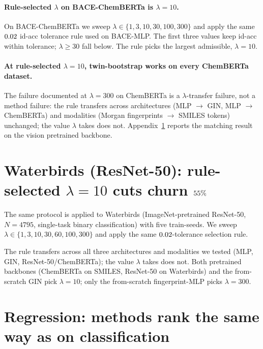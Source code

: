 \paragraph{\boldmath Rule-selected $\lambda$ on BACE-ChemBERTa is $\lambda{=}10$.}
On BACE-ChemBERTa we sweep $\lambda \in \{1, 3, 10, 30, 100, 300\}$
and apply the same $0.02$ id-acc tolerance rule used on
BACE-MLP.  The first three values keep id-acc within tolerance;
$\lambda \geq 30$ fall below.  The rule picks the largest admissible,
$\lambda{=}10$.

\paragraph{\boldmath At rule-selected $\lambda{=}10$, twin-bootstrap works on every
ChemBERTa dataset.}



The failure documented at $\lambda{=}300$ on ChemBERTa is a
$\lambda$-transfer failure, not a method failure: the rule transfers
across architectures (MLP $\to$ GIN, MLP $\to$ ChemBERTa) and
modalities (Morgan fingerprints $\to$ SMILES tokens) unchanged; the
value $\lambda$ takes does not.
Appendix~\ref{app:waterbirds_lambda} reports the matching result on
the vision pretrained backbone.

\section{\boldmath Waterbirds (ResNet-50): rule-selected $\lambda{=}10$ cuts churn $55\%$}
\label{app:waterbirds_lambda}

The same protocol is applied to Waterbirds (ImageNet-pretrained
ResNet-50, $N{=}4795$, single-task binary classification) with five
train-seeds.  We sweep
$\lambda \in \{1, 3, 10, 30, 60, 100, 300\}$ and apply the same
$0.02$-tolerance selection rule.



The rule transfers across all three architectures and modalities we
tested (MLP, GIN, ResNet-50/ChemBERTa); the value $\lambda$ takes does
not.  Both pretrained backbones (ChemBERTa on SMILES, ResNet-50 on
Waterbirds) and the from-scratch GIN pick $\lambda{=}10$; only the
from-scratch fingerprint-MLP picks $\lambda{=}300$.

\section{Regression: methods rank the same way as on classification}
\label{app:regression}

